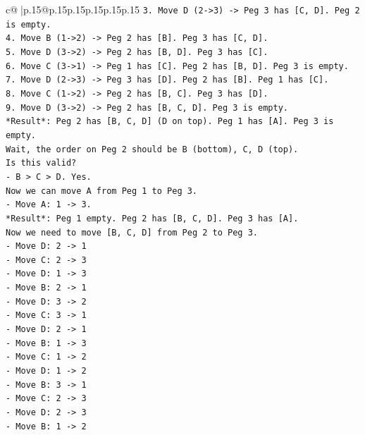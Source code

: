 \documentclass{article}
\begin{document}
{\begin{supertabular}{c@{$\;$}|p{.15\linewidth}@{}p{.15\linewidth}p{.15\linewidth}p{.15\linewidth}p{.15\linewidth}p{.15\linewidth}}
{{{\texttt{3. Move D (2{-}>3) {-}> Peg 3 has {[}C, D{]}. Peg 2 is empty.} \\
\texttt{4. Move B (1{-}>2) {-}> Peg 2 has {[}B{]}. Peg 3 has {[}C, D{]}.} \\
\texttt{5. Move D (3{-}>2) {-}> Peg 2 has {[}B, D{]}. Peg 3 has {[}C{]}.} \\
\texttt{6. Move C (3{-}>1) {-}> Peg 1 has {[}C{]}. Peg 2 has {[}B, D{]}. Peg 3 is empty.} \\
\texttt{7. Move D (2{-}>3) {-}> Peg 3 has {[}D{]}. Peg 2 has {[}B{]}. Peg 1 has {[}C{]}.} \\
\texttt{8. Move C (1{-}>2) {-}> Peg 2 has {[}B, C{]}. Peg 3 has {[}D{]}.} \\
\texttt{9. Move D (3{-}>2) {-}> Peg 2 has {[}B, C, D{]}. Peg 3 is empty.} \\
\texttt{*Result*: Peg 2 has {[}B, C, D{]} (D on top). Peg 1 has {[}A{]}. Peg 3 is empty.} \\
\texttt{Wait, the order on Peg 2 should be B (bottom), C, D (top).} \\
\texttt{Is this valid?} \\
\texttt{{-} B > C > D. Yes.} \\
\texttt{Now we can move A from Peg 1 to Peg 3.} \\
\texttt{{-} Move A: 1 {-}> 3.} \\
\texttt{*Result*: Peg 1 empty. Peg 2 has {[}B, C, D{]}. Peg 3 has {[}A{]}.} \\
\texttt{Now we need to move {[}B, C, D{]} from Peg 2 to Peg 3.} \\
\texttt{{-} Move D: 2 {-}> 1} \\
\texttt{{-} Move C: 2 {-}> 3} \\
\texttt{{-} Move D: 1 {-}> 3} \\
\texttt{{-} Move B: 2 {-}> 1} \\
\texttt{{-} Move D: 3 {-}> 2} \\
\texttt{{-} Move C: 3 {-}> 1} \\
\texttt{{-} Move D: 2 {-}> 1} \\
\texttt{{-} Move B: 1 {-}> 3} \\
\texttt{{-} Move C: 1 {-}> 2} \\
\texttt{{-} Move D: 1 {-}> 2} \\
\texttt{{-} Move B: 3 {-}> 1} \\
\texttt{{-} Move C: 2 {-}> 3} \\
\texttt{{-} Move D: 2 {-}> 3} \\
\texttt{{-} Move B: 1 {-}> 2} \\
}}}
\end{supertabular}}
\end{document}
